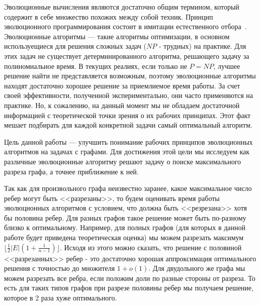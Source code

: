 \documentclass[times]{itmo-student-thesis}
\begin{document}

\tableofcontents

\startprefacepage
Эволюционные вычисления являются достаточно общим термином, который содержит в себе множество похожих между собой техник.
Принцип эволюционного программирования состоит в имитации естественного отбора~\cite{Skobtsov08}.
Эволюционные алгоритмы --- такие алгоритмы оптимизации, в основном используещиеся для решения сложных задач ($NP$ - трудных) на практике.
Для этих задач не существует детерминированного алгоритма, решающего задачу за полиномиальное время.
В текущих реалиях, если только не $P = NP$, лучшее решение найти не представляется возможным, поэтому эволюционные алгоритмы находят достаточно хорошее решение за приемлиемое время работы.
За счет своей эффективности, полученной экспериментально, они часто применяются на практике.
Но, к сожалению, на данный момент мы не обладаем достаточной информацией с теоретической точки зрения о их рабочих принципах.
Этот факт мешает подбирать для каждой конкретной задачи самый оптимальный алгоритм.

Цель данной работы --- улучшить понимание рабочих принципов эволюционных алгоритмов на задачах с графами.
Для достижения этой цели мы исследуем как различные эволюционные алгоритму решают задачу о поиске максимального разреза графа, а точнее приближение к ней.

Так как для произвольного графа неизвестно заранее, какое максимальное число ребер могут быть <<разрезаны>>, то будем оценивать время работы эволюционных алгоритмов с условием, что должна быть <<резрезана>> хотя бы половина ребер.
Для разных графов такое решение может быть по-разному близко к оптимальному.
Например, для полных графов (для которых в данной работе будет приведена теоретическая оценка) мы можем разрезать максимум $\lfloor\frac{1}{2} |E| (1 + \frac{1}{n-1})\rfloor$.
Исходя из этого можно сказать, что решение с половиной <<разрезанных>> ребер - это достаточно хорошая аппроксимация оптимального решения с точностью до множителя $1 + o(1)$.
Для двудольного же графа мы можем разрезать все ребра, если положим доли по разные стороны от разреза.
То есть для таких типов графов при разрезе половины ребер мы получаем решение, которое в 2 раза хуже оптимального.
\end{document}

